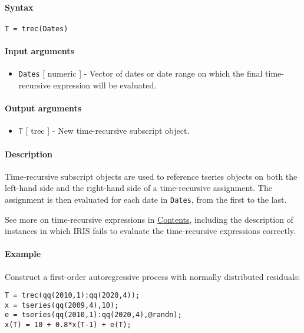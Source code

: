 


	\paragraph{Syntax}\label{syntax}

\begin{verbatim}
T = trec(Dates)
\end{verbatim}

\paragraph{Input arguments}\label{input-arguments}

\begin{itemize}
\itemsep1pt\parskip0pt
\item
  \texttt{Dates} {[} numeric {]} - Vector of dates or date range on
  which the final time-recursive expression will be evaluated.
\end{itemize}

\paragraph{Output arguments}\label{output-arguments}

\begin{itemize}
\itemsep1pt\parskip0pt
\item
  \texttt{T} {[} trec {]} - New time-recursive subscript object.
\end{itemize}

\paragraph{Description}\label{description}

Time-recursive subscript objects are used to reference tseries objects
on both the left-hand side and the right-hand side of a time-recursive
assignment. The assignment is then evaluated for each date in
\texttt{Dates}, from the first to the last.

See more on time-recursive expressions in
\href{trec/Contents}{Contents}, including the description of instances
in which IRIS fails to evaluate the time-recursive expressions
correctly.

\paragraph{Example}\label{example}

Construct a first-order autoregressive process with normally distributed
residuals:

\begin{verbatim}
T = trec(qq(2010,1):qq(2020,4));
x = tseries(qq(2009,4),10);
e = tseries(qq(2010,1):qq(2020,4),@randn);
x(T) = 10 + 0.8*x(T-1) + e(T);
\end{verbatim}


